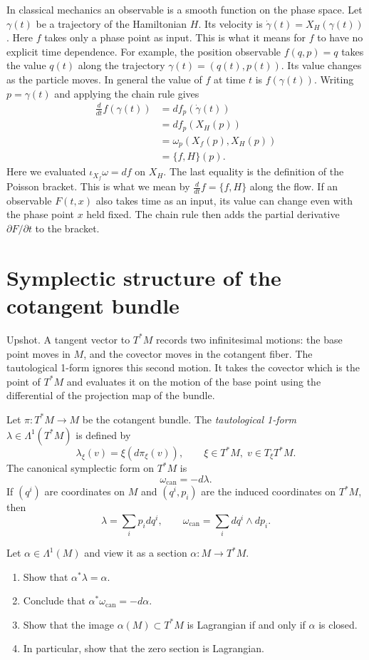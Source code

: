 \noindent
In classical mechanics an observable is a
smooth function on the phase space.  Let
$\gamma(t)$ be a trajectory of the
Hamiltonian $H$.  Its velocity is
$\dot\gamma(t)=X_H(\gamma(t))$.
Here $f$ takes only a phase point as input.
This is what it means for $f$ to have no
explicit time dependence.  For example, the
position observable $f(q,p)=q$ takes the
value $q(t)$ along the trajectory
$\gamma(t)=(q(t),p(t))$.  Its value changes
as the particle moves.  In general the value
of $f$ at time $t$ is $f(\gamma(t))$.
Writing $p=\gamma(t)$ and applying the chain
rule gives
$$
\begin{aligned}
\frac{d}{dt}f(\gamma(t))
&=df_p(\dot\gamma(t))\\
&=df_p(X_H(p))\\
&=\omega_p(X_f(p),X_H(p))\\
&=\{f,H\}(p).
\end{aligned}
$$
Here we evaluated $\iota_{X_f}\omega=df$
on $X_H$.
The last equality is the definition of the
Poisson bracket.  This is what we mean by
$\frac{d}{dt}f=\{f,H\}$ along the flow.
If an observable $F(t,x)$ also takes time
as an input, its value can change even with
the phase point $x$ held fixed.  The chain
rule then adds the partial derivative
$\partial F/\partial t$ to the bracket.

\section{Symplectic structure of the
cotangent bundle}
\label{section-sympl-struc-cotan-bundl}

\noindent
Upshot. A tangent vector to $T^*M$
records two infinitesimal motions: the base
point moves in $M$, and the covector moves in
the cotangent fiber. The tautological 1-form
ignores this second motion. It takes the
covector which is the point of $T^*M$ and
evaluates it on the motion of the base point
using the differential of the projection
map of the bundle.

\medskip\noindent
Let $\pi:T^*M \to M$ be the cotangent bundle.
The {\it tautological 1-form} $\lambda \in
\Lambda^1(T^*M)$
is defined by
$$
\lambda_\xi(v)=\xi(d\pi_\xi(v)),\qquad \xi
\in T^*M,\; v \in T_\xi T^*M.
$$
The canonical symplectic form on $T^*M$ is
$$
\omega_{\text{can}}=-d\lambda.
$$
If $(q^i)$ are coordinates on $M$
and $(q^i,p_i)$ are the induced coordinates
on $T^*M$, then
$$
\lambda=\sum_i p_i dq^i,\qquad
\omega_{\text{can}}=\sum_i dq^i \wedge dp_i.
$$

\begin{exercise}
\label{exercise-cotan-bundl-canon-form}
Let $\alpha \in \Lambda^1(M)$ and view it as
a section
$\alpha:M \to T^*M$.
\begin{enumerate}
\item Show that $\alpha^*\lambda=\alpha$.
\item Conclude that
$\alpha^*\omega_{\text{can}}=-d\alpha$.
\item Show that the image $\alpha(M) \subset
T^*M$ is Lagrangian
if and only if $\alpha$ is closed.
\item In particular, show that the zero
section is Lagrangian.
\end{enumerate}
\end{exercise}

